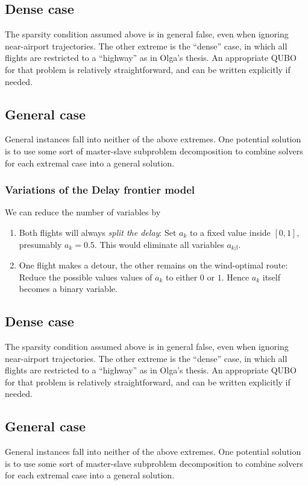\documentclass{article}
\begin{document}
% 

\subsection{Dense case}
The sparsity condition assumed above is in general false, even when ignoring near-airport trajectories.
The other extreme is the ``dense'' case, in which all flights are restricted to a ``highway'' as in Olga's thesis.
An appropriate QUBO for that problem is relatively straightforward, and can be written explicitly if needed.

\subsection{General case}
General instances fall into neither of the above extremes.
One potential solution is to use some sort of master-slave subproblem decomposition to combine solvers for each extremal case into a general solution.
\subsubsection{Variations of the Delay frontier model}
We can reduce the number of variables by
\begin{enumerate}
    \item Both flights will always \textit{split the delay}: Set $a_k$ to a fixed value inside $[0, 1]$, presumably $a_k = 0.5$. This would eliminate all variables $a_{k\beta}$.
    \item One flight makes a detour, the other remains on the wind-optimal route: Reduce the possible values values of $a_k$ to either $0$ or $1$. Hence $a_k$ itself becomes a binary variable.
\end{enumerate}

\subsection{Dense case}
The sparsity condition assumed above is in general false, even when ignoring near-airport trajectories.
The other extreme is the ``dense'' case, in which all flights are restricted to a ``highway'' as in Olga's thesis.
An appropriate QUBO for that problem is relatively straightforward, and can be written explicitly if needed.

\subsection{General case}
General instances fall into neither of the above extremes.
One potential solution is to use some sort of master-slave subproblem decomposition to combine solvers for each extremal case into a general solution.
\end{document}
